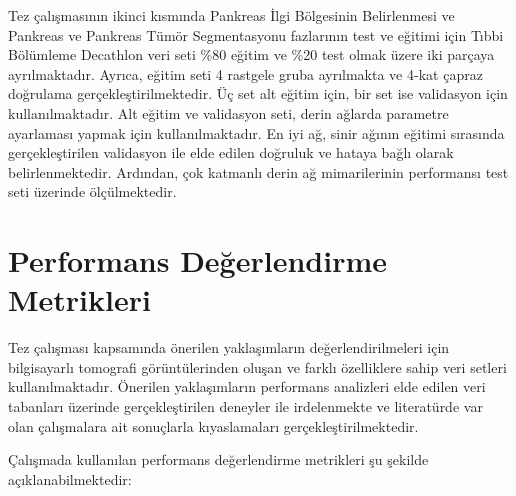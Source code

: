 Tez çalışmasının ikinci kısmında Pankreas İlgi Bölgesinin Belirlenmesi ve Pankreas ve Pankreas Tümör Segmentasyonu fazlarının test ve eğitimi için Tıbbi Bölümleme Decathlon veri seti \%80 eğitim ve \%20 test olmak üzere iki parçaya ayrılmaktadır. Ayrıca, eğitim seti 4 rastgele gruba ayrılmakta ve 4-kat çapraz doğrulama gerçekleştirilmektedir. Üç set alt eğitim için, bir set ise validasyon için kullanılmaktadır. Alt eğitim ve validasyon seti, derin ağlarda parametre ayarlaması yapmak için kullanılmaktadır. En iyi ağ, sinir ağının eğitimi sırasında gerçekleştirilen validasyon ile elde edilen doğruluk ve hataya bağlı olarak belirlenmektedir. Ardından, çok katmanlı derin ağ mimarilerinin performansı test seti üzerinde ölçülmektedir.

\section{Performans Değerlendirme Metrikleri}
Tez çalışması kapsamında önerilen yaklaşımların değerlendirilmeleri için bilgisayarlı tomografi görüntülerinden oluşan ve farklı özelliklere sahip veri setleri kullanılmaktadır. Önerilen yaklaşımların performans analizleri elde edilen veri tabanları üzerinde gerçekleştirilen deneyler ile irdelenmekte ve literatürde var olan çalışmalara ait sonuçlarla kıyaslamaları gerçekleştirilmektedir. 

Çalışmada kullanılan performans değerlendirme metrikleri şu şekilde açıklanabilmektedir:

